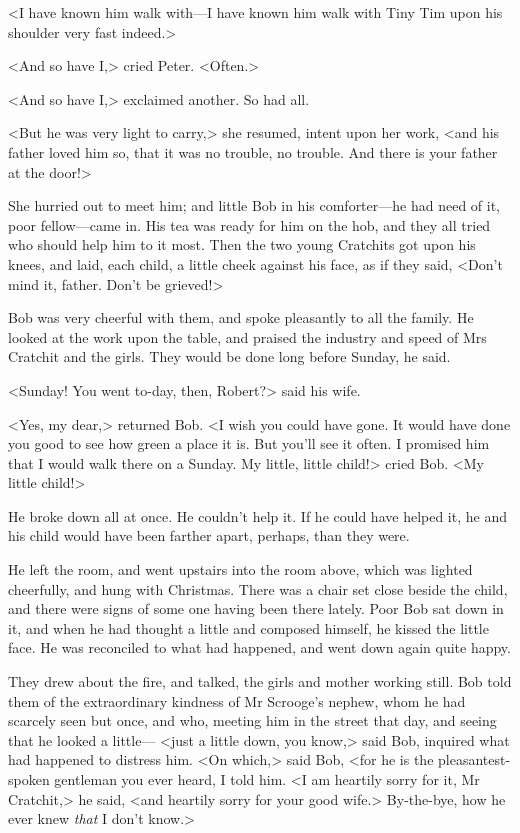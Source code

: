 <I have known him walk with—I have known him walk with Tiny Tim upon his
shoulder very fast indeed.>

<And so have I,> cried Peter. <Often.>

<And so have I,> exclaimed another. So had all.

<But he was very light to carry,> she resumed, intent upon her work, <and his
father loved him so, that it was no trouble, no trouble. And there is your
father at the door!>

She hurried out to meet him; and little Bob in his comforter—he had need of it,
poor fellow—came in. His tea was ready for him on the hob, and they all tried
who should help him to it most. Then the two young Cratchits got upon his knees,
and laid, each child, a little cheek against his face, as if they said, <Don't
mind it, father. Don't be grieved!>

Bob was very cheerful with them, and spoke pleasantly to all the family. He
looked at the work upon the table, and praised the industry and speed of
Mrs Cratchit and the girls. They would be done long before Sunday, he said.

<Sunday! You went to-day, then, Robert?> said his wife.

<Yes, my dear,> returned Bob. <I wish you could have gone. It would have done
you good to see how green a place it is. But you'll see it often. I promised him
that I would walk there on a Sunday. My little, little child!> cried Bob. <My
little child!>

He broke down all at once. He couldn't help it. If he could have helped it, he
and his child would have been farther apart, perhaps, than they were.

He left the room, and went upstairs into the room above, which was lighted
cheerfully, and hung with Christmas. There was a chair set close beside the
child, and there were signs of some one having been there lately. Poor Bob sat
down in it, and when he had thought a little and composed himself, he kissed the
little face. He was reconciled to what had happened, and went down again quite
happy.

They drew about the fire, and talked, the girls and mother working still. Bob
told them of the extraordinary kindness of Mr Scrooge's nephew, whom he had
scarcely seen but once, and who, meeting him in the street that day, and seeing
that he looked a little— <just a little down, you know,> said Bob, inquired what
had happened to distress him. <On which,> said Bob, <for he is the
pleasantest-spoken gentleman you ever heard, I told him. <I am heartily sorry
for it, Mr Cratchit,> he said, <and heartily sorry for your good wife.>
By-the-bye, how he ever knew \emph{that} I don't know.>


